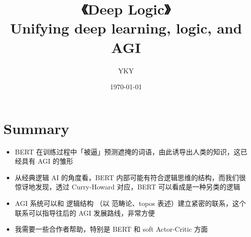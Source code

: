 


\usepackage{color}
\usepackage{mathtools}
\usepackage{hyperref}

\usepackage[backend=biber,style=numeric]{biblatex}


\usepackage{graphicx} %
\usepackage{tikz-cd}
\usepackage[export]{adjustbox}%
\usepackage{verbatim} %

\newcommand{\emp}[1]{{\color{violet}#1}}
\newcommand*\confoundFace{$\vcenter{\hbox{\texttt{[image: ../confounded-face.jpg]}}}$}



\title{
{{\Huge《Deep Logic》} \\ \vspace*{0.2cm} Unifying deep learning, logic, and AGI}}
\author{YKY} %
\date{\today} %

\maketitle

\section*{Summary}
\begin{itemize}
	\item BERT 在训练过程中「被逼」预测遮掩的词语，由此诱导出人类的知识，这已经具有 AGI 的雏形
	
	\item 从经典逻辑 AI 的角度看，BERT 内部可能有符合逻辑思维的结构，而我们很惊讶地发现，透过 Curry-Howard 对应，BERT 可以看成是一种另类的逻辑
	
	\item AGI 系统可以和 逻辑结构 （以 范畴论、topos 表述）建立紧密的联系，这个联系可以指导往后的 AGI 发展路线，非常方便
	
	\item 我需要一些合作者帮助，特别是 BERT 和 soft Actor-Critic 方面
\end{itemize}

